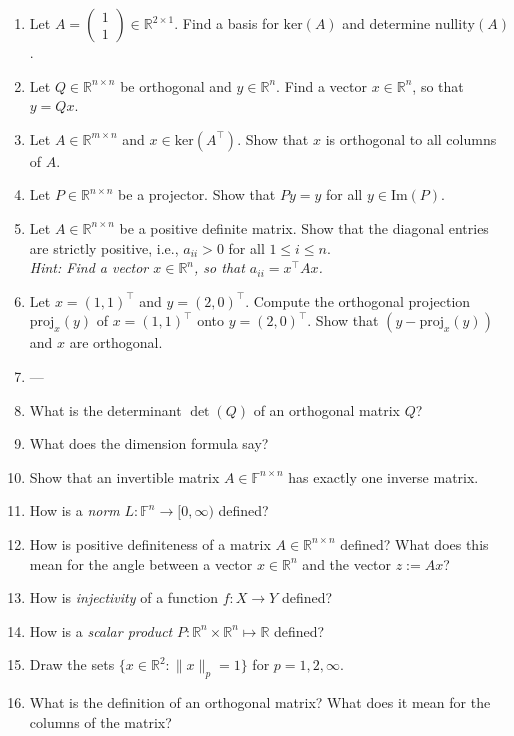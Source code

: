 \begin{enumerate}
	\item Let $A = \begin{pmatrix}1\\1\end{pmatrix} \in \mathbb{R}^{2 \times 1}$. Find a basis for $\text{ker}(A) $ and determine $\text{nullity}(A)$.
	\item Let $Q \in \mathbb{R}^{n \times n}$ be orthogonal and $y \in\mathbb{R}^{n}$. Find a vector $x \in\mathbb{R}^{n}$, so that $y = Qx$.
	\item Let $A \in \mathbb{R}^{m \times n}$ and  $x \in \text{ker}(A^\top)$. Show that $x$ is orthogonal to all columns of $A$.
	\item Let $P\in\mathbb{R}^{n\times n}$ be a projector. Show that $Py = y$ for all $y \in \text{Im}(P)$.
	\item  Let $A \in \mathbb{R}^{n \times n}$ be a positive definite matrix. Show that the diagonal entries are strictly positive, i.e.,  $a_{ii} > 0$ for all $1\leq i\leq n$.\\
	\textit{Hint: Find a vector $x\in\mathbb{R}^{n}$, so that $a_{ii}=x^\top A x$.}
	\item Let  $x=(1,1)^\top$ and $y=(2,0)^\top$. Compute the orthogonal projection $\text{proj}_x(y) $ of $x=(1,1)^\top$ onto $y=(2,0)^\top$. Show that $(y - \text{proj}_x(y))$ and $x$ are orthogonal.
	\item ---
	\item What is the determinant $\det(Q)$ of an orthogonal matrix $Q$?
	\item What does the dimension formula say?
	\item  Show that an invertible matrix $A\in\mathbb{F}^{n \times n}$ has exactly one inverse matrix.
	\item How is a \textit{norm} $L: \mathbb{F}^n \to [0, \infty)$ defined?
	\item How is positive definiteness of a matrix $A\in \mathbb{R}^{n \times n}$ defined? What does this mean for the angle
	between a vector $x \in \mathbb{R}^{n}$ and the vector $z := Ax$?
	\item How is \textit{injectivity} of a function $f\colon X \to Y$ defined?
	\item How is a \textit{scalar product} $P\colon \mathbb{R}^n \times \mathbb{R}^n \mapsto \mathbb{R}$ defined?
	\item Draw the sets $\{x \in \mathbb{R}^{2} \colon \|x\|_p = 1   \}$ for $p=1,2,\infty$.
	\item What is the definition of an orthogonal matrix? What does it mean for the columns of the matrix?

\end{enumerate}
